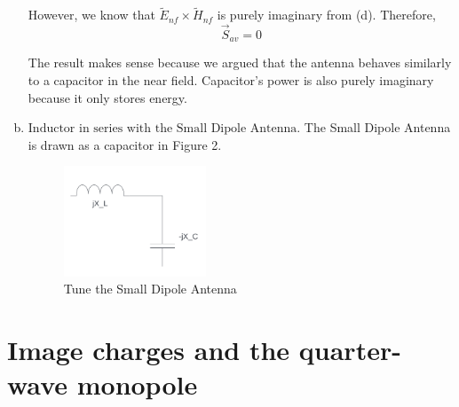 \documentclass{article} %
\begin{document}
\begin{enumerate}[(a)]
            However, we know that $\widetilde{E}_{nf} \times \widetilde{H}_{nf}$ is purely imaginary from (d). Therefore,
            \[\boxed{\vec{S}_{av} = 0}\]

            The result makes sense because we argued that the antenna behaves similarly to a capacitor in the near field. Capacitor's power is also purely imaginary because it only stores energy.
      \item $\boxed{\text{Inductor in series with the Small Dipole Antenna}}$. The Small Dipole Antenna is drawn as a capacitor in Figure 2.
            \begin{figure}[H]
                  \centering
                  \includegraphics[width=0.4\textwidth]{./image/figure2.png}
                  \caption{Tune the Small Dipole Antenna}
            \end{figure}
\end{enumerate}

\section{Image charges and the quarter-wave monopole}
\end{document}
